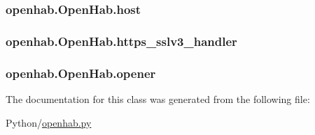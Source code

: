 \subsubsection[{\texorpdfstring{host}{host}}]{\setlength{\rightskip}{0pt plus 5cm}openhab.\+Open\+Hab.\+host}\hypertarget{classopenhab_1_1OpenHab_a826d2f891c8b4a75abc3d0addfe2791f}{}\label{classopenhab_1_1OpenHab_a826d2f891c8b4a75abc3d0addfe2791f}
\subsubsection[{\texorpdfstring{https\+\_\+sslv3\+\_\+handler}{https_sslv3_handler}}]{\setlength{\rightskip}{0pt plus 5cm}openhab.\+Open\+Hab.\+https\+\_\+sslv3\+\_\+handler}\hypertarget{classopenhab_1_1OpenHab_a19e269f9557250b74388ec3ace6d180b}{}\label{classopenhab_1_1OpenHab_a19e269f9557250b74388ec3ace6d180b}
\subsubsection[{\texorpdfstring{opener}{opener}}]{\setlength{\rightskip}{0pt plus 5cm}openhab.\+Open\+Hab.\+opener}\hypertarget{classopenhab_1_1OpenHab_a8fd99a4690e6c0748f7d841d0b235db6}{}\label{classopenhab_1_1OpenHab_a8fd99a4690e6c0748f7d841d0b235db6}


The documentation for this class was generated from the following file\+:\begin{DoxyCompactItemize}
\item 
Python/\hyperlink{openhab_8py}{openhab.\+py}\end{DoxyCompactItemize}
